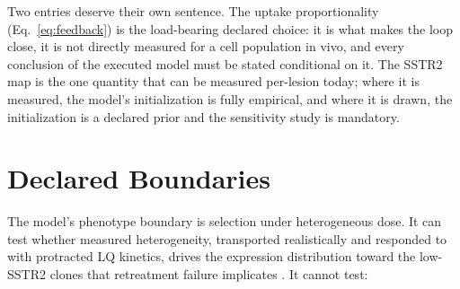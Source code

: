 \documentclass[11pt]{article}
\begin{document}
Two entries deserve their own sentence. The uptake proportionality
(Eq.~\ref{eq:feedback}) is the load-bearing declared choice: it is what makes the loop
close, it is not directly measured for a cell population in vivo, and every conclusion of
the executed model must be stated conditional on it. The SSTR2 map is the one quantity
that can be measured per-lesion today; where it is measured, the model's initialization is
fully empirical, and where it is drawn, the initialization is a declared prior and the
sensitivity study is mandatory.

\section{Declared Boundaries}\label{sec:boundaries}

The model's phenotype boundary is selection under heterogeneous dose. It can test whether
measured heterogeneity, transported realistically and responded to with protracted LQ
kinetics, drives the expression distribution toward the low-SSTR2 clones that
retreatment failure implicates \cite{feijtel2021,fransson2024}. It cannot test:
\end{document}
